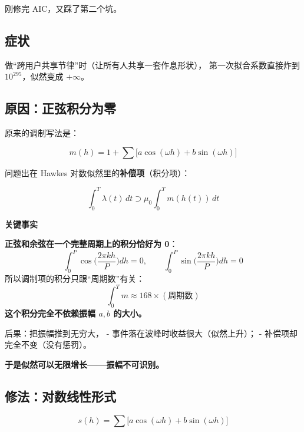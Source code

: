 \documentclass[UTF8,a4paper,11pt]{ctexart}
\newenvironment{explainbox}[1]
{\begin{center}\begin{minipage}{0.94\textwidth}\colorbox{boxbg}{\parbox{0.92\textwidth}{\textbf{#1}\par\vspace{2pt}}}}
{\end{minipage}\end{center}}
\begin{document}
刚修完 AIC，又踩了第二个坑。

\subsection{症状}

做“跨用户共享节律”时（让所有人共享一套作息形状），
第一次拟合系数直接炸到 $10^{295}$，似然变成 $+\infty$。

\subsection{原因：正弦积分为零}

原来的调制写法是：

\begin{equation}
m(h) = 1 + \sum \big[a\cos(\omega h) + b\sin(\omega h)\big]
\end{equation}

问题出在 Hawkes 对数似然里的\textbf{补偿项}（积分项）：

\begin{equation}
\int_0^T \lambda(t)\,dt \supset \mu_0 \int_0^T m(h(t))\,dt
\end{equation}

\begin{explainbox}{关键事实}
\textbf{正弦和余弦在一个完整周期上的积分恰好为 0}：
\begin{equation}
\int_0^{P} \cos\!\Big(\frac{2\pi k h}{P}\Big) dh = 0, \qquad
\int_0^{P} \sin\!\Big(\frac{2\pi k h}{P}\Big) dh = 0
\end{equation}
所以调制项的积分只跟“周期数”有关：
\begin{equation}
\int_0^T m \approx 168 \times (\text{周期数})
\end{equation}
\textbf{这个积分完全不依赖振幅 $a, b$ 的大小。}
\end{explainbox}

后果：把振幅推到无穷大，
- 事件落在波峰时收益很大（似然上升）；
- 补偿项却完全不变（没有惩罚）。

\textbf{于是似然可以无限增长——振幅不可识别。}

\subsection{修法：对数线性形式}

\begin{equation}
s(h) = \sum \big[a\cos(\omega h) + b\sin(\omega h)\big]
\end{equation}
\end{document}
